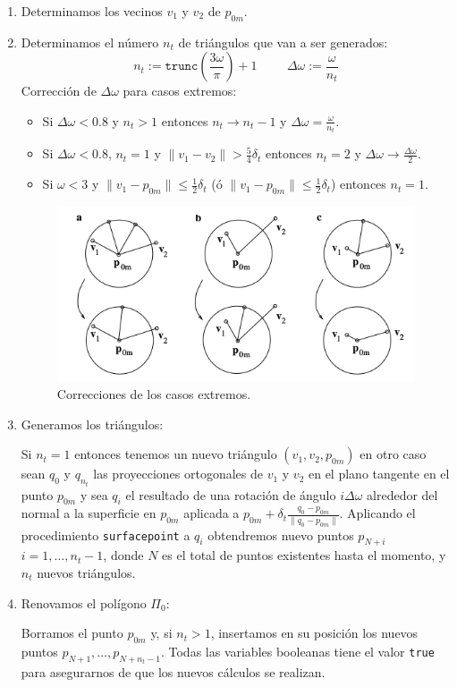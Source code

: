 \begin{enumerate}
\item Determinamos los vecinos $v_1$ y $v_2$ de $p_{0m}$.
\item Determinamos el número $n_t$ de triángulos que van a ser generados:
$$n_t := \mathtt{trunc}\left( \frac{3\omega}{\pi} \right) + 1 \hspace{1cm} \Delta \omega := \frac{\omega}{n_t}$$
Corrección de $\Delta \omega$ para casos extremos:
\begin{itemize}
\item Si $\Delta \omega < 0.8$ y $n_t > 1$ entonces $n_t \to n_t - 1$ y $\Delta \omega = \frac{\omega}{n_t}$.
\item Si $\Delta \omega < 0.8$, $n_t = 1$ y $\| v_1 - v_2 \| > \frac{5}{4} \delta_t$ entonces $n_t = 2$ y $\Delta \omega \to \frac{\Delta \omega}{2}$.
\item Si $\omega < 3$ y $\| v_1 - p_{0m} \| \leq \frac{1}{2} \delta_t$ (ó $\| v_1 - p_{0m} \| \leq \frac{1}{2} \delta_t$) entonces $n_t = 1$.
\end{itemize}

\begin{figure}[h]
\centering
\includegraphics[scale=0.5]{images/hartmann5.png}
\caption{Correcciones de los casos extremos.}
\end{figure}

\item Generamos los triángulos:
\par Si $n_t = 1$ entonces tenemos un nuevo triángulo $(v_1, v_2, p_{0m})$ en otro caso sean $q_0$ y $q_{n_t}$ las proyecciones ortogonales de $v_1$ y $v_2$ en el plano tangente en el punto $p_{0m}$ y sea $q_i$ el resultado de una rotación de ángulo $i \Delta \omega$ alrededor del normal a la superficie en $p_{0m}$ aplicada a $p_{0m} + \delta_t \frac{q_0 - p_{0m}}{\| q_0 - p_{0m} \|}$. Aplicando el procedimiento \texttt{surfacepoint} a $q_i$ obtendremos nuevo puntos $p_{N+i}$ $i = 1, \dotso, n_t -1$, donde $N$ es el total de puntos existentes hasta el momento, y $n_t$ nuevos triángulos.
\item Renovamos el polígono $\Pi_0$:
\par Borramos el punto $p_{0m}$ y, si $n_t > 1$, insertamos en su posición los nuevos puntos $p_{N+1}, \dotso, p_{N+n_t-1}$. Todas las variables booleanas tiene el valor \texttt{true} para asegurarnos de que los nuevos cálculos se realizan.
\end{enumerate}

